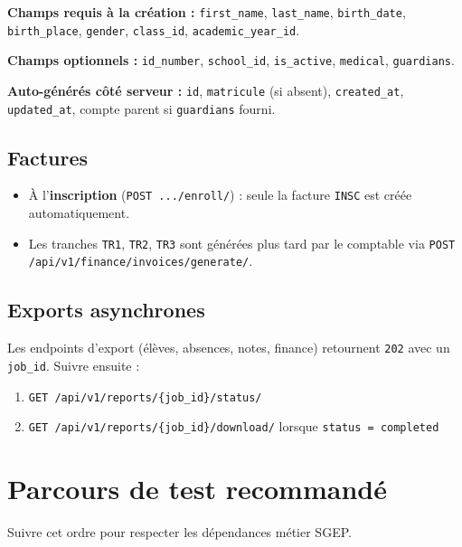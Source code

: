 \documentclass[11pt,a4paper]{article}
\begin{document}
\textbf{Champs requis à la création :}
\texttt{first\_name}, \texttt{last\_name}, \texttt{birth\_date}, \texttt{birth\_place}, \texttt{gender}, \texttt{class\_id}, \texttt{academic\_year\_id}.

\textbf{Champs optionnels :}
\texttt{id\_number}, \texttt{school\_id}, \texttt{is\_active}, \texttt{medical}, \texttt{guardians}.

\textbf{Auto-générés côté serveur :}
\texttt{id}, \texttt{matricule} (si absent), \texttt{created\_at}, \texttt{updated\_at}, compte parent si \texttt{guardians} fourni.

\subsection{Factures}

\begin{itemize}[noitemsep]
    \item À l'\textbf{inscription} (\texttt{POST .../enroll/}) : seule la facture \texttt{INSC} est créée automatiquement.
    \item Les tranches \texttt{TR1}, \texttt{TR2}, \texttt{TR3} sont générées plus tard par le comptable via \texttt{POST /api/v1/finance/invoices/generate/}.
\end{itemize}

\subsection{Exports asynchrones}

Les endpoints d'export (élèves, absences, notes, finance) retournent \texttt{202} avec un \texttt{job\_id}. Suivre ensuite :
\begin{enumerate}[noitemsep]
    \item \texttt{GET /api/v1/reports/\{job\_id\}/status/}
    \item \texttt{GET /api/v1/reports/\{job\_id\}/download/} lorsque \texttt{status = completed}
\end{enumerate}

\section{Parcours de test recommandé}

Suivre cet ordre pour respecter les dépendances métier SGEP.
\end{document}
